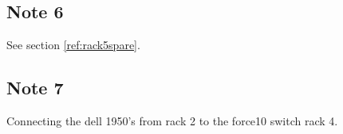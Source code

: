 \documentclass[a4paper]{article}
\begin{document}
\subsection{Note 6}

See section \ref{ref:rack5spare}.


\subsection{Note 7}

Connecting the dell 1950's from rack 2 to the force10 switch rack 4.
\end{document}
